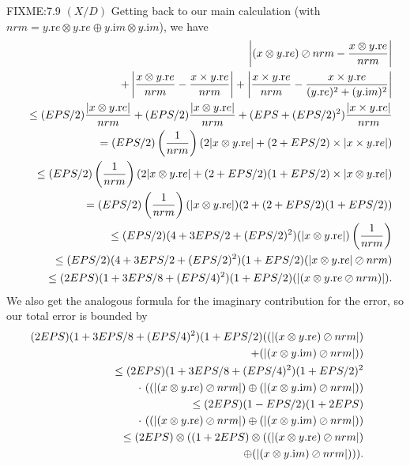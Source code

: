 \begin{definition}
\begin{proposition}{FIXME:7.9 $(X / D)$}
\phantom{someone}
Getting back to our main calculation (with $nrm = y.{\mathrm re} \otimes y.{\mathrm re} \oplus y.{\mathrm im} \otimes y.{\mathrm im}$), we
have
\begin{eqnarray*}
&&\hskip-16pt\left|(x \otimes y.{\mathrm re}) \oslash nrm - {x \otimes y.{\mathrm re} \over nrm}\right|\\
&&\quad +
\left|{x \otimes y.{\mathrm re} \over nrm} - {x \times y.{\mathrm re} \over nrm}\right| +
\left|{x \times y.{\mathrm re} \over nrm} - 
{x \times y.{\mathrm re}  \over (y.{\mathrm re})^2 + (y.{\mathrm im})^2}\right|\\
&&  \le(EPS/2){|x \otimes y.{\mathrm re}| \over nrm} +
        (EPS/2){|x \otimes   y.{\mathrm re}| \over nrm} +
(EPS + (EPS/2)^2) {|x \times   y.{\mathrm re}| \over nrm}\\
&&  =(EPS/2)\left({1 \over nrm}\right)(2 |x \otimes y.{\mathrm re}| +
(2 + EPS/2) \times |x \times y.{\mathrm re}| )\\
&&  \le (EPS/2)\left({1 \over nrm}\right)(2 |x \otimes y.{\mathrm re}| +
(2 + EPS/2)(1 + EPS/2) \times |x \otimes y.{\mathrm re}| )\\
&&\quad = (EPS/2)\left({1 \over nrm}\right)(|x \otimes y.{\mathrm re}|)
(2 + (2 + EPS/2)(1+EPS/2))\\
&&  \le (EPS/2)(4 + 3EPS/2 + (EPS/2)^2)(|x \otimes y.{\mathrm re}|)\left({1 \over nrm}\right)\\
&& \le (EPS/2)(4 + 3EPS/2 +
(EPS/2)^2)(1+EPS/2)(|x \otimes y.{\mathrm re}| \oslash nrm)\\
&&  \le (2EPS)(1 + 3EPS/8 + (EPS/4)^2)(1+EPS/2)(|(x \otimes y.{\mathrm
re} \oslash nrm)|).
\end{eqnarray*}
 We also get the analogous formula for the imaginary contribution for the error, so our total error is
bounded by
\begin{eqnarray*}
&&\hskip-24pt (2EPS)(1 + 3EPS/8 + (EPS/4)^2)(1+EPS/2)((|(x \otimes y.{\mathrm re})\oslash nrm|)\\
&&\quad+(|(x \otimes y.{\mathrm
im})\oslash nrm|))\\
&& \le (2EPS)(1 + 3EPS/8 + (EPS/4)^2)(1+EPS/2)^2\\
&&\quad\cdot\ ((|(x \otimes y.{\mathrm re})\oslash nrm|)  \oplus (|(x \otimes
y.{\mathrm im})\oslash nrm|))\\
&&  \le (2EPS)(1 - EPS/2)(1+ 2EPS)\\
&&\quad\cdot\ ((|(x \otimes y.{\mathrm re})\oslash nrm|) \oplus (|(x \otimes y.{\mathrm
im})\oslash nrm|))\\
&&  \le (2EPS) \otimes ((1+ 2EPS) \otimes ((|(x \otimes y.{\mathrm re})\oslash nrm|)\\
&&\quad  \oplus (|(x \otimes y.{\mathrm
im})\oslash nrm|))).
\end{eqnarray*}


\end{proposition}
\end{definition}
